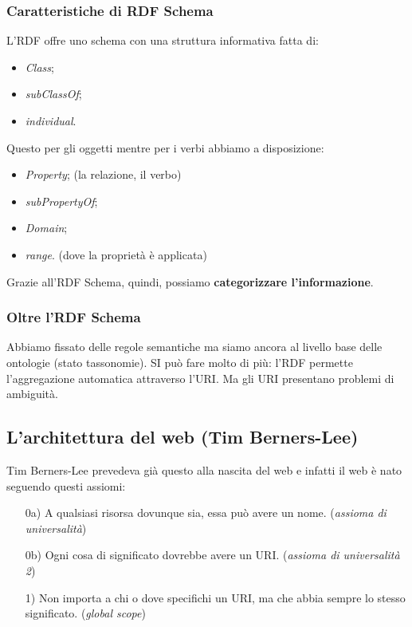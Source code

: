 			\subsubsection{Caratteristiche di RDF Schema}
				L'RDF offre uno schema con una struttura informativa fatta di:
				\begin{itemize}
					\item \emph{Class};
					\item \emph{subClassOf};
					\item \emph{individual}.
				\end{itemize}
				Questo per gli oggetti mentre per i verbi abbiamo a disposizione:
				\begin{itemize}
					\item \emph{Property}; (la relazione, il verbo)
					\item \emph{subPropertyOf};
					\item \emph{Domain};
					\item \emph{range}. (dove la proprietà è applicata)
				\end{itemize}
				Grazie all'RDF Schema, quindi, possiamo \textbf{categorizzare l'informazione}.

			\subsubsection{Oltre l'RDF Schema}
				Abbiamo fissato delle regole semantiche ma siamo ancora al livello base delle ontologie (stato tassonomie). SI può fare molto di più: l'RDF permette l'aggregazione automatica attraverso l'URI. Ma gli URI presentano problemi di ambiguità.
			
		\subsection{L'architettura del web (Tim Berners-Lee)}
			Tim Berners-Lee prevedeva già questo alla nascita del web e infatti il web è nato seguendo questi assiomi:
			\begin{itemize}
				\item [0a)] A qualsiasi risorsa dovunque sia, essa può avere un nome. (\emph{assioma di universalità})
				\item [0b)] Ogni cosa di significato dovrebbe avere un URI. (\emph{assioma di universalità 2})
				\item [1)] Non importa a chi o dove specifichi un URI, ma che abbia sempre lo stesso significato. (\emph{global scope})
			\end{itemize}
			

